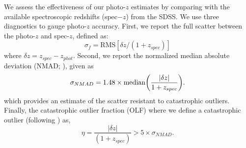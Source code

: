 \documentclass[apj, revtex4-1]{emulateapj}
\begin{document}
We assess the effectiveness of our photo-$z$ estimates by comparing with the available spectroscopic redshifts (spec$-z$) from the SDSS. We use three diagnostics to gauge photo-$z$ accuracy. First, we report the full scatter between the photo-$z$ and spec-$z$, defined as:
\begin{equation}
	\sigma_f = \mathrm{RMS}[\delta z/(1+z_{spec})]
\end{equation}
where $\delta z = z_{spec} - z_{phot}$. Second, we report the normalized median absolute deviation (NMAD; \citealt{Ilbert2009, Dahlen2013, Molino2017}), given as
\begin{equation}
	\sigma_{NMAD} = 1.48 \times \mathrm{median} \bigg{(} \frac{|\delta z|}{1+z_{spec}} \bigg{)}.
\end{equation}
which provides an estimate of the scatter resistant to catastrophic outliers. Finally, the catastrophic outlier fraction (OLF) where we define a catastrophic outlier (following \citealt{Molino2017}) as,
\begin{equation}
	\eta = \frac{|\delta z|}{(1+z_{spec})} > 5 \times \sigma_{NMAD}.
\end{equation}
\end{document}

